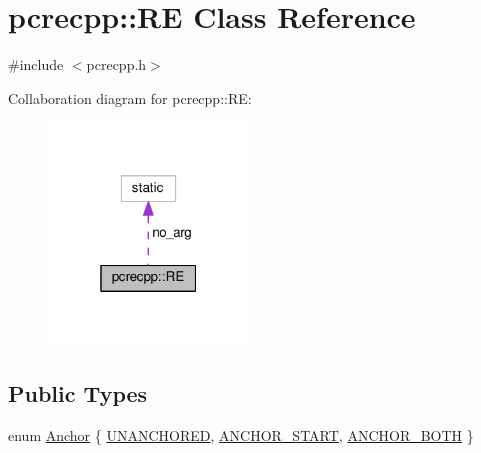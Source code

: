 \hypertarget{classpcrecpp_1_1RE}{}\section{pcrecpp\+:\+:RE Class Reference}
\label{classpcrecpp_1_1RE}


{\ttfamily \#include $<$pcrecpp.\+h$>$}



Collaboration diagram for pcrecpp\+:\+:RE\+:
\nopagebreak
\begin{figure}[H]
\begin{center}
\leavevmode
\includegraphics[width=151pt]{classpcrecpp_1_1RE__coll__graph}
\end{center}
\end{figure}
\subsection*{Public Types}
\begin{DoxyCompactItemize}
\item 
enum \hyperlink{classpcrecpp_1_1RE_aafe8a162d00ec7a7d6d2ba67652735ef}{Anchor} \{ \hyperlink{classpcrecpp_1_1RE_aafe8a162d00ec7a7d6d2ba67652735efa8511ace935198310276d68934194a16a}{U\+N\+A\+N\+C\+H\+O\+R\+ED}, 
\hyperlink{classpcrecpp_1_1RE_aafe8a162d00ec7a7d6d2ba67652735efa59db4a3f1e5cb92ae648e57c71204757}{A\+N\+C\+H\+O\+R\+\_\+\+S\+T\+A\+RT}, 
\hyperlink{classpcrecpp_1_1RE_aafe8a162d00ec7a7d6d2ba67652735efaa7140045b2005adcb6de536923377341}{A\+N\+C\+H\+O\+R\+\_\+\+B\+O\+TH}
 \}
\end{DoxyCompactItemize}
